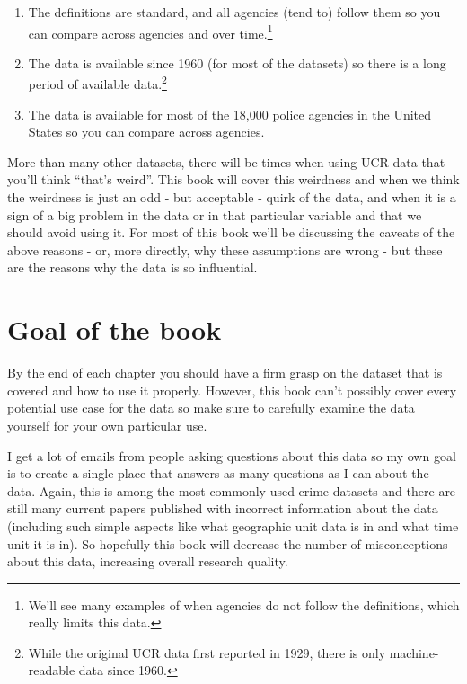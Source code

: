 \documentclass[
  12pt,
  openany]{book}
\providecommand{\tightlist}{%
  \setlength{\itemsep}{0pt}\setlength{\parskip}{0pt}}
\begin{document}
\begin{enumerate}
\def\labelenumi{\arabic{enumi}.}
\tightlist
\item
  The definitions are standard, and all agencies (tend to) follow them so you can compare across agencies and over time.\footnote{We'll see many examples of when agencies do not follow the definitions, which really limits this data.}
\item
  The data is available since 1960 (for most of the datasets) so there is a long period of available data.\footnote{While the original UCR data first reported in 1929, there is only machine-readable data since 1960.}
\item
  The data is available for most of the 18,000 police agencies in the United States so you can compare across agencies.
\end{enumerate}

More than many other datasets, there will be times when using UCR data that you'll think ``that's weird''. This book will cover this weirdness and when we think the weirdness is just an odd - but acceptable - quirk of the data, and when it is a sign of a big problem in the data or in that particular variable and that we should avoid using it. For most of this book we'll be discussing the caveats of the above reasons - or, more directly, why these assumptions are wrong - but these are the reasons why the data is so influential.

\hypertarget{goal-of-the-book}{%
\section{Goal of the book}\label{goal-of-the-book}}

By the end of each chapter you should have a firm grasp on the dataset that is covered and how to use it properly. However, this book can't possibly cover every potential use case for the data so make sure to carefully examine the data yourself for your own particular use.

I get a lot of emails from people asking questions about this data so my own goal is to create a single place that answers as many questions as I can about the data. Again, this is among the most commonly used crime datasets and there are still many current papers published with incorrect information about the data (including such simple aspects like what geographic unit data is in and what time unit it is in). So hopefully this book will decrease the number of misconceptions about this data, increasing overall research quality.
\end{document}
